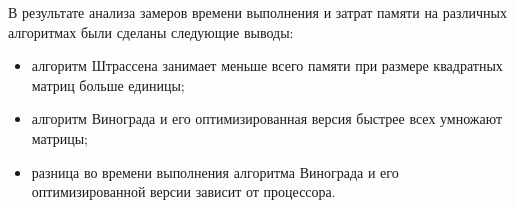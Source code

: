 В результате анализа замеров времени выполнения и затрат памяти на различных алгоритмах были сделаны следующие выводы:

\begin{itemize}
	\item алгоритм Штрассена занимает меньше всего памяти при размере квадратных матриц больше единицы;
	\item алгоритм Винограда и его оптимизированная версия быстрее всех умножают матрицы;
	\item разница во времени выполнения алгоритма Винограда и его оптимизированной версии зависит от процессора.
\end{itemize}